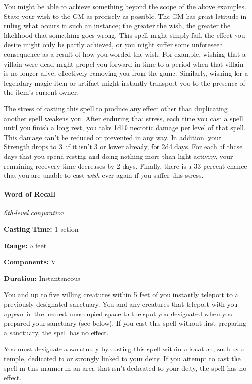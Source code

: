 \documentclass[
]{article}
\begin{document}
You might be able to achieve something beyond the scope of the above
examples. State your wish to the GM as precisely as possible. The GM has
great latitude in ruling what occurs in such an instance; the greater
the wish, the greater the likelihood that something goes wrong. This
spell might simply fail, the effect you desire might only be partly
achieved, or you might suffer some unforeseen consequence as a result of
how you worded the wish. For example, wishing that a villain were dead
might propel you forward in time to a period when that villain is no
longer alive, effectively removing you from the game. Similarly, wishing
for a legendary magic item or artifact might instantly transport you to
the presence of the item's current owner.

The stress of casting this spell to produce any effect other than
duplicating another spell weakens you. After enduring that stress, each
time you cast a spell until you finish a long rest, you take 1d10
necrotic damage per level of that spell. This damage can't be reduced or
prevented in any way. In addition, your Strength drops to 3, if it isn't
3 or lower already, for 2d4 days. For each of those days that you spend
resting and doing nothing more than light activity, your remaining
recovery time decreases by 2 days. Finally, there is a 33 percent chance
that you are unable to cast \emph{wish} ever again if you suffer this
stress.

\hypertarget{word-of-recall}{%
\paragraph{Word of Recall}\label{word-of-recall}}

\emph{6th-level conjuration}

\textbf{Casting Time:} 1 action

\textbf{Range:} 5 feet

\textbf{Components:} V

\textbf{Duration:} Instantaneous

You and up to five willing creatures within 5 feet of you instantly
teleport to a previously designated sanctuary. You and any creatures
that teleport with you appear in the nearest unoccupied space to the
spot you designated when you prepared your sanctuary (see below). If you
cast this spell without first preparing a sanctuary, the spell has no
effect.

You must designate a sanctuary by casting this spell within a location,
such as a temple, dedicated to or strongly linked to your deity. If you
attempt to cast the spell in this manner in an area that isn't dedicated
to your deity, the spell has no effect.
\end{document}
